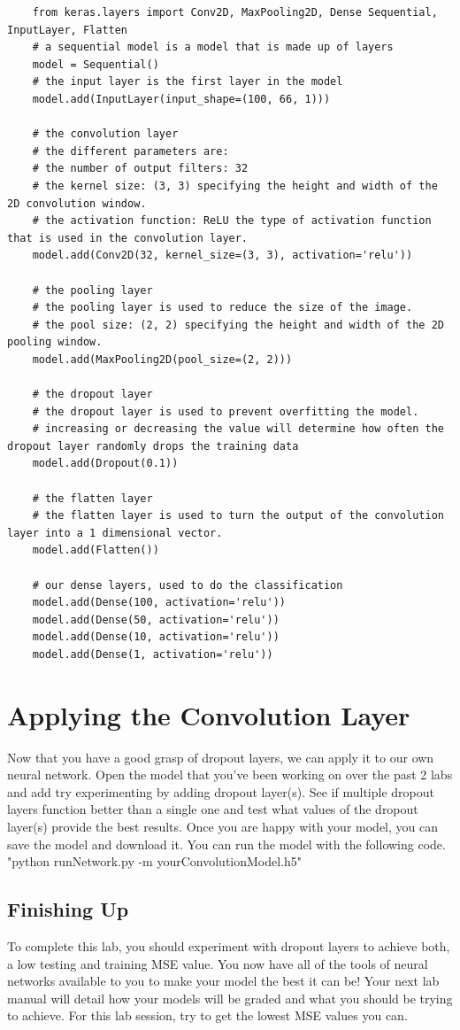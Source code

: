 \documentclass[11pt]{report}
\begin{document}
\begin{verbatim} 
    from keras.layers import Conv2D, MaxPooling2D, Dense Sequential, InputLayer, Flatten
    # a sequential model is a model that is made up of layers
    model = Sequential()
    # the input layer is the first layer in the model
    model.add(InputLayer(input_shape=(100, 66, 1)))

    # the convolution layer
    # the different parameters are:
    # the number of output filters: 32
    # the kernel size: (3, 3) specifying the height and width of the 2D convolution window.
    # the activation function: ReLU the type of activation function that is used in the convolution layer.
    model.add(Conv2D(32, kernel_size=(3, 3), activation='relu'))

    # the pooling layer
    # the pooling layer is used to reduce the size of the image.
    # the pool size: (2, 2) specifying the height and width of the 2D pooling window.
    model.add(MaxPooling2D(pool_size=(2, 2)))

    # the dropout layer
    # the dropout layer is used to prevent overfitting the model.
    # increasing or decreasing the value will determine how often the dropout layer randomly drops the training data
    model.add(Dropout(0.1))

    # the flatten layer
    # the flatten layer is used to turn the output of the convolution layer into a 1 dimensional vector.
    model.add(Flatten())

    # our dense layers, used to do the classification
    model.add(Dense(100, activation='relu'))
    model.add(Dense(50, activation='relu'))
    model.add(Dense(10, activation='relu'))
    model.add(Dense(1, activation='relu'))
\end{verbatim}


\chapter{Applying the Convolution Layer}
Now that you have a good grasp of dropout layers, we can apply it to our own neural network. Open the model that you've been working on over the past 2 labs and add try experimenting by adding dropout layer(s). See if multiple dropout layers function better than a single one and test what values of the dropout layer(s) provide the best results. Once you are happy with your model, you can save the model and download it. You can run the model with the following code.
"python runNetwork.py -m yourConvolutionModel.h5"

\section{Finishing Up}
To complete this lab, you should experiment with dropout layers to achieve both, a low testing and training MSE value.
You now have all of the tools of neural networks available to you to make your model the best it can be! Your next lab manual will detail how your models will be graded and what you should be trying to achieve. For this lab session, try to get the lowest MSE values you can.
\end{document}

